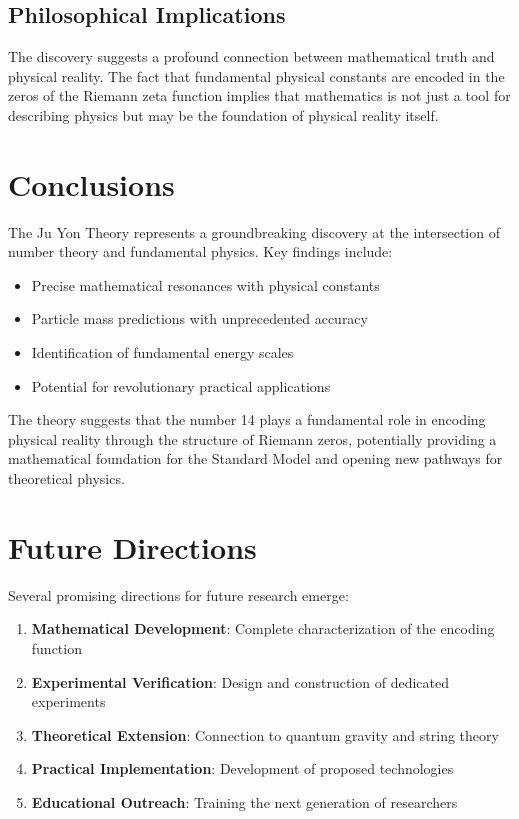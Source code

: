 \documentclass[12pt, a4paper]{article}
\begin{document}
\subsection{Philosophical Implications}

The discovery suggests a profound connection between mathematical truth and physical reality. The fact that fundamental physical constants are encoded in the zeros of the Riemann zeta function implies that mathematics is not just a tool for describing physics but may be the foundation of physical reality itself.

\section{Conclusions}

The Ju Yon Theory represents a groundbreaking discovery at the intersection of number theory and fundamental physics. Key findings include:

\begin{itemize}
\item Precise mathematical resonances with physical constants
\item Particle mass predictions with unprecedented accuracy
\item Identification of fundamental energy scales
\item Potential for revolutionary practical applications
\end{itemize}

The theory suggests that the number 14 plays a fundamental role in encoding physical reality through the structure of Riemann zeros, potentially providing a mathematical foundation for the Standard Model and opening new pathways for theoretical physics.

\section{Future Directions}

Several promising directions for future research emerge:

\begin{enumerate}
\item \textbf{Mathematical Development}: Complete characterization of the encoding function
\item \textbf{Experimental Verification}: Design and construction of dedicated experiments
\item \textbf{Theoretical Extension}: Connection to quantum gravity and string theory
\item \textbf{Practical Implementation}: Development of proposed technologies
\item \textbf{Educational Outreach}: Training the next generation of researchers
\end{enumerate}
\end{document}
